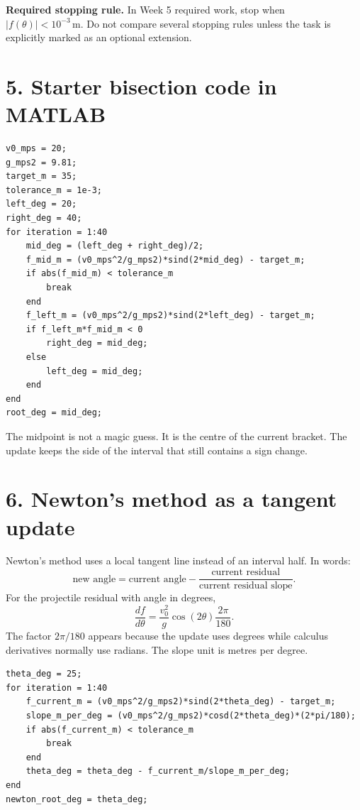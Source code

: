 \documentclass[11pt,a4paper]{article}
\newcommand{\units}[1]{\,\mathrm{#1}}
\begin{document}
\begin{keybox}\textbf{Required stopping rule.} In Week 5 required work, stop when $|f(\theta)|<10^{-3}\units{m}$. Do not compare several stopping rules unless the task is explicitly marked as an optional extension.\end{keybox}

\section*{5. Starter bisection code in MATLAB}
\begin{lstlisting}[style=matlabstyle,caption={Starter MATLAB implementation of the bracketed bisection update}]
v0_mps = 20;
g_mps2 = 9.81;
target_m = 35;
tolerance_m = 1e-3;
left_deg = 20;
right_deg = 40;
for iteration = 1:40
    mid_deg = (left_deg + right_deg)/2;
    f_mid_m = (v0_mps^2/g_mps2)*sind(2*mid_deg) - target_m;
    if abs(f_mid_m) < tolerance_m
        break
    end
    f_left_m = (v0_mps^2/g_mps2)*sind(2*left_deg) - target_m;
    if f_left_m*f_mid_m < 0
        right_deg = mid_deg;
    else
        left_deg = mid_deg;
    end
end
root_deg = mid_deg;
\end{lstlisting}
The midpoint is not a magic guess. It is the centre of the current bracket. The update keeps the side of the interval that still contains a sign change.

\section*{6. Newton's method as a tangent update}
Newton's method uses a local tangent line instead of an interval half. In words:
\[
\text{new angle} = \text{current angle} - \frac{\text{current residual}}{\text{current residual slope}}.
\]
For the projectile residual with angle in degrees,
\[
\frac{df}{d\theta}=\frac{v_0^2}{g}\cos(2\theta)\frac{2\pi}{180}.
\]
The factor $2\pi/180$ appears because the update uses degrees while calculus derivatives normally use radians. The slope unit is metres per degree.

\begin{lstlisting}[style=matlabstyle,caption={Starter MATLAB implementation of Newton's angle update}]
theta_deg = 25;
for iteration = 1:40
    f_current_m = (v0_mps^2/g_mps2)*sind(2*theta_deg) - target_m;
    slope_m_per_deg = (v0_mps^2/g_mps2)*cosd(2*theta_deg)*(2*pi/180);
    if abs(f_current_m) < tolerance_m
        break
    end
    theta_deg = theta_deg - f_current_m/slope_m_per_deg;
end
newton_root_deg = theta_deg;
\end{lstlisting}
\end{document}
